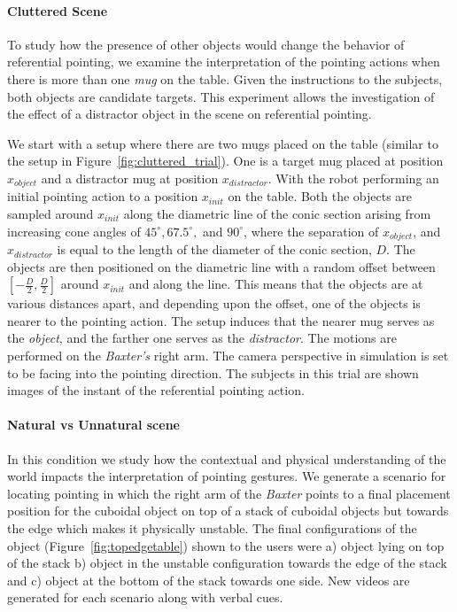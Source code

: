 \documentclass[letterpaper]{article} %
\newcommand{\xinit}{\ensuremath{x_{\textit{init}}}}
\newcommand{\xobject}{\ensuremath{x_{\textit{object}}}}
\newcommand{\xdistractor}{\ensuremath{x_{\textit{distractor}}}}
\begin{document}
\paragraph{Cluttered Scene}
To study how the presence of other objects would change the behavior of referential pointing, we examine the interpretation of the pointing actions when there is more than one \textit{mug} on the table. Given the instructions to the subjects, both objects are candidate targets. This experiment allows the investigation of the effect of a distractor object in the scene on referential pointing.  

We start with a setup where there are two mugs placed on the table (similar to the setup in Figure~\ref{fig:cluttered_trial}). One is a target mug placed at position $\xobject$ and a distractor mug at position $\xdistractor$. With the robot performing an initial pointing action to a position $\xinit$ on the table. Both the objects are sampled around $\xinit$ along the diametric line of the conic section arising from increasing cone angles of $45^\circ, 67.5^\circ, $ and $90^\circ$, where the separation of $\xobject$, and $\xdistractor$ is equal to the length of the diameter of the conic section, $D$. The objects are then positioned on the diametric line with a random offset between $[-\frac{D}{2}, \frac{D}{2}]$ around $\xinit$ and along the line. This means that the objects are at various distances apart, and depending upon the offset, one of the objects is nearer to the pointing action. The setup induces that the nearer mug serves as the \textit{object}, and the farther one serves as the \textit{distractor}. The motions are performed on the \textit{Baxter's} right arm. The camera perspective in simulation is set to be facing into the pointing direction. The subjects in this trial are shown images of the instant of the referential pointing action.


\paragraph{Natural vs Unnatural scene}
In this condition we study how the contextual and physical understanding of the world impacts the interpretation of pointing gestures. We generate a scenario for locating pointing in which the right arm of the \textit{Baxter} points to a final placement position for the cuboidal object on top of a stack of cuboidal objects but towards the edge which makes it physically unstable. The final configurations of the object (Figure~\ref{fig:topedgetable}) shown to the users were a) object lying on top of the stack b) object in the unstable configuration towards the edge of the stack and c) object at the bottom of the stack towards one side. New videos are generated for each scenario along with verbal cues.
\end{document}
